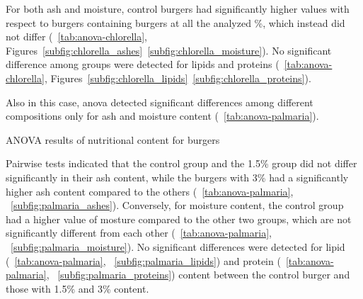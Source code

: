 For both ash and moisture, control burgers had significantly higher values with respect to burgers containing  burgers at all the analyzed \%, which instead did not differ (\tab{}~\ref{tab:anova-chlorella}, Figures~\ref{subfig:chlorella_ashes}~\ref{subfig:chlorella_moisture}). No significant difference among groups were detected for lipids and proteins (\tab{}~\ref{tab:anova-chlorella}, Figures~\ref{subfig:chlorella_lipids}~\ref{subfig:chlorella_proteins}).




Also in this case, \gls{anova} detected significant differences among different compositions only for ash and moisture content (\tab{}~\ref{tab:anova-palmaria}).

\begin{table}[H]
	\centering
	\scriptsize
	
	\caption{ANOVA results of nutritional content for  burgers}
	\label{tab:anova-palmaria}
\end{table}

Pairwise tests indicated that the control group and the \num{1.5}\% group did not differ significantly in their ash content, while the burgers with \num{3}\%  had a significantly higher ash content compared to the others (\tab{}~\ref{tab:anova-palmaria}, \fig{}~\ref{subfig:palmaria_ashes}). Conversely, for moisture content, the control group had a higher value of mosture compared to the other two groups, which are not significantly different from each other (\tab{}~\ref{tab:anova-palmaria}, \fig{}~\ref{subfig:palmaria_moisture}). No significant differences were detected for lipid (\tab{}~\ref{tab:anova-palmaria}, \fig{}~\ref{subfig:palmaria_lipids}) and protein (\tab{}~\ref{tab:anova-palmaria}, \fig{}~\ref{subfig:palmaria_proteins}) content between the control burger and those with \num{1.5}\% and \num{3}\% content.



